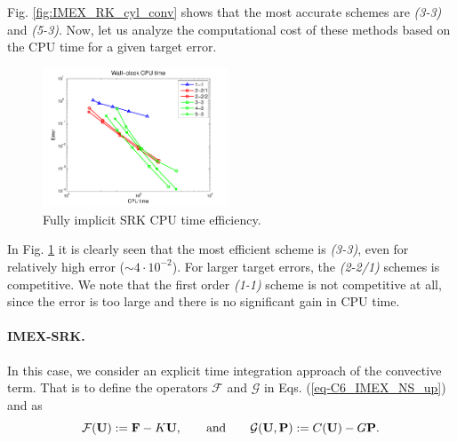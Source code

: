 
Fig. \ref{fig:IMEX_RK_cyl_conv} shows that the most accurate schemes are \textit{(3-3)} and \textit{(5-3)}. Now, let us analyze the computational cost of these methods based on the CPU time for a given target error. %
\begin{figure}[h!]
  \centering
  \includegraphics[width=0.49\textwidth]{Figures/Chapter6/cylinder/Efficiency}  
  \caption{Fully implicit SRK CPU time efficiency.}
  \label{fig:IMEX_RK_cyl_effi}
\end{figure}
In Fig. \ref{fig:IMEX_RK_cyl_effi} it is clearly seen that the most efficient scheme is \textit{(3-3)}, even for relatively high error ($\sim4\cdot10^{-2}$). For larger target errors, the \textit{(2-2/1)} schemes is competitive. We note that the first order \textit{(1-1)} scheme is not competitive at all, since the error is too large and there is no significant gain in CPU time. %

\paragraph{IMEX-SRK.}

In this case, we consider an explicit time integration approach of the convective term. That is to define the operators $\mathcal{F}$ and $\mathcal{G}$ in  Eqs. (\ref{eq-C6_IMEX_NS_up}) and  as
$$\mathcal{F}({\bf U}):={\bf F}-K{\bf U},\quad\quad\mbox{and}\quad\quad\mathcal{G}({\bf U},{\bf P}):=C({\bf U})-G{\bf P}.$$

